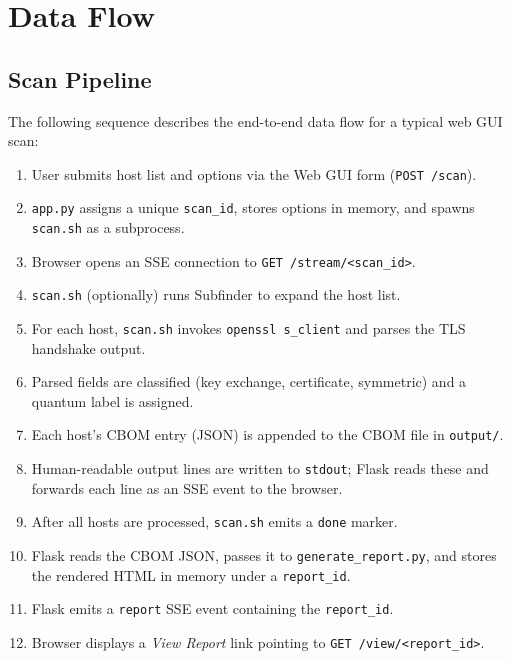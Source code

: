 \section{Data Flow}
\label{sec:data_flow}

\subsection{Scan Pipeline}

The following sequence describes the end-to-end data flow for a typical web GUI scan:

\begin{enumerate}[noitemsep, leftmargin=1.8cm, label=\textbf{Step \arabic*.}]
  \item User submits host list and options via the Web GUI form
        (\texttt{POST /scan}).
  \item \texttt{app.py} assigns a unique \texttt{scan\_id}, stores options in
        memory, and spawns \texttt{scan.sh} as a subprocess.
  \item Browser opens an SSE connection to \texttt{GET /stream/<scan\_id>}.
  \item \texttt{scan.sh} (optionally) runs Subfinder to expand the host list.
  \item For each host, \texttt{scan.sh} invokes \texttt{openssl s\_client}
        and parses the TLS handshake output.
  \item Parsed fields are classified (key exchange, certificate, symmetric) and
        a quantum label is assigned.
  \item Each host's CBOM entry (JSON) is appended to the CBOM file in
        \texttt{output/}.
  \item Human-readable output lines are written to \texttt{stdout}; Flask reads
        these and forwards each line as an SSE event to the browser.
  \item After all hosts are processed, \texttt{scan.sh} emits a
        \texttt{done} marker.
  \item Flask reads the CBOM JSON, passes it to \texttt{generate\_report.py},
        and stores the rendered HTML in memory under a \texttt{report\_id}.
  \item Flask emits a \texttt{report} SSE event containing the \texttt{report\_id}.
  \item Browser displays a \textit{View Report} link pointing to
        \texttt{GET /view/<report\_id>}.
\end{enumerate}

